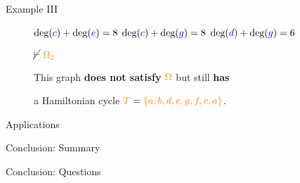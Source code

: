 \documentclass[pdf]{beamer}
\newcommand{\T}{\textcolor{orange}{T}}
\newcommand{\bluec}{\textcolor{blue}{c}}
\newcommand{\blued}{\textcolor{blue}{d}}
\newcommand{\bluee}{\textcolor{blue}{e}}
\newcommand{\blueg}{\textcolor{blue}{g}}
\newcommand{\ore}{\textcolor{gold}{\Omega}}
\newcommand{\oresecondcond}{\textcolor{gold}{\Omega_2}}
\newcommand{\gdeg}{\text{deg}}
\begin{document}
\begin{frame}{Example III}
\begin{figure}
{            \pause

            $\gdeg(\bluec) + \gdeg(\bluee) = 8$ \qquad
            $\gdeg(\bluec) + \gdeg(\blueg) = 8$ \qquad
            $\gdeg(\blued) + \gdeg(\blueg) = 6$}

            \pause

            $\cancel\vdash \text{ } \oresecondcond$

            \pause

            \vspace{5px}

            This graph \textbf{does not satisfy} $\ore$ but still \textbf{has}
            
            a Hamiltonian cycle $\T = \textcolor{orange}{\{a,b,d,e,g,f,c,a\}}$.
        \end{figure}
    \end{frame}

    \begin{frame}{Applications}

    \end{frame}

    \begin{frame}{Conclusion: Summary}

    \end{frame}

    \begin{frame}{Conclusion: Questions}

    \end{frame}
\end{document}
